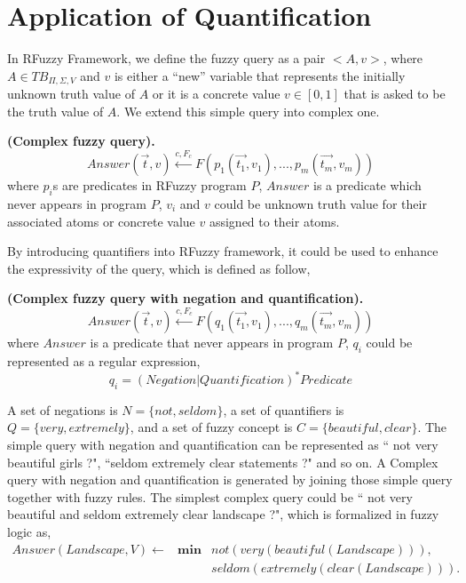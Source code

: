 \section{Application of Quantification}
\label{sec:ApplicationQuantification}
In RFuzzy Framework, we define the fuzzy query as a pair $<A,v>$, where $A \in TB_{\Pi,\Sigma,V}$ and $v$ is either a ``new'' variable that represents the initially unknown truth value of $A$ or it is a concrete value $v \in [0,1]$ that is asked to be the truth value of $A$. We extend this simple query into complex one.

\begin{defin} \textbf{(Complex fuzzy query).}
\label{def:ComplexFuzzyQuery}
\[Answer(\vec{t},v) \stackrel{c,F_c}{\longleftarrow} F(p_1(\vec{t_1},v_1),...,p_m(\vec{t_m},v_m))\]
where $p_i$s are predicates in RFuzzy program $P$, $Answer$ is a predicate which never appears in program $P$, $v_i$ and $v$ could be unknown truth value for their associated atoms or concrete value $v$ assigned to their atoms.

\end{defin}

By introducing quantifiers into RFuzzy framework, it could be used to enhance the expressivity of the query, which is defined as follow,

\begin{defin} \textbf{(Complex fuzzy query with negation and quantification). }
\label{def:CFQNegQuan}
\[Answer(\vec{t},v) \stackrel{c,F_c}{\longleftarrow} F(q_1(\vec{t_1},v_1),...,q_m(\vec{t_m},v_m))\]
where $Answer$ is a predicate that never appears in program $P$, $q_i$ could be represented as a regular expression, 
\[q_i = (Negation|Quantification)^*Predicate\]
\end{defin}

\begin{ex}
A set of negations is $N=\{not, seldom\}$, a set of quantifiers is $Q=\{very, extremely\}$, and a set of fuzzy concept is $C=\{beautiful, clear\}$. The simple query with negation and quantification can be represented as `` not very beautiful girls ?", ``seldom extremely clear statements ?" and so on. A Complex query with negation and quantification is generated by joining those simple query together with fuzzy rules. The simplest complex query could be `` not very beautiful and seldom extremely clear landscape ?", which is formalized in fuzzy logic as,
\begin{align*}
Answer(Landscape, V) {\longleftarrow} & \textbf{min} & not(very(beautiful(Landscape))),\\ 
&  & seldom(extremely(clear(Landscape))). \\
\end{align*}
\end{ex}